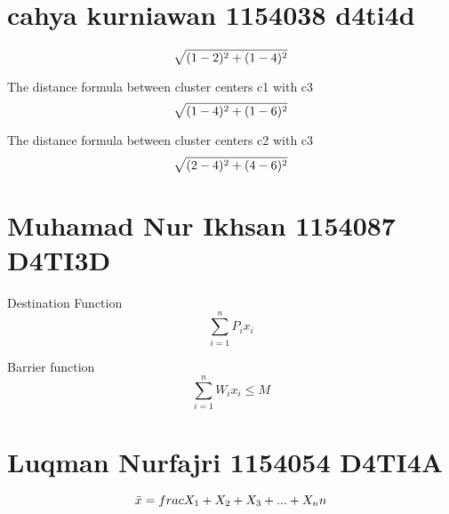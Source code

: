 \section{cahya kurniawan 1154038 d4ti4d}
\par
\begin{equation}
\label{eq:1}
\sqrt{(1-2)\sp{2} + (1-4)\sp{2}}
    \end{equation}
\par
The distance formula between cluster centers c1 with c3
\begin{equation}
\label{eq:2}
\sqrt{(1-4)\sp{2} + (1-6)\sp{2}}
    \end{equation}
\par
The distance formula between cluster centers c2 with c3
\begin{equation}
\label{eq:3}
\sqrt{(2-4)\sp{2} + (4-6)\sp{2}}
    \end{equation}


\section{Muhamad Nur Ikhsan 1154087 D4TI3D}
\par Destination Function
\begin{equation}
  \sum \limits_{i=1}^{n} {P_i} {x_i}
  \label{eq:4}
\end{equation}

\par Barrier function
\begin{equation}
  \sum \limits_{i=1}^{n} {W_i} {x_i} \leq M
  \label{eq:5}
\end{equation}


\section{Luqman Nurfajri 1154054 D4TI4A}
\begin{equation}\label{eq:1}
\Bar{x}=frac{X_1+X_2+X_3+...+X_n}{n}
\end{equation}
